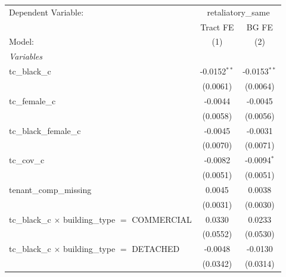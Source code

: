 \par\endgroup
\begingroup
\centering
\begin{tabular}{lcc}
   \tabularnewline \midrule \midrule
   Dependent Variable: & \multicolumn{2}{c}{retaliatory\_same}\\
                                                                       & Tract FE       & BG FE \\   
   Model:                                                              & (1)            & (2)\\  
   \midrule
   \emph{Variables}\\
   tc\_black\_c                                                        & -0.0152$^{**}$ & -0.0153$^{**}$\\   
                                                                       & (0.0061)       & (0.0064)\\   
   tc\_female\_c                                                       & -0.0044        & -0.0045\\   
                                                                       & (0.0058)       & (0.0056)\\   
   tc\_black\_female\_c                                                & -0.0045        & -0.0031\\   
                                                                       & (0.0070)       & (0.0071)\\   
   tc\_cov\_c                                                          & -0.0082        & -0.0094$^{*}$\\   
                                                                       & (0.0051)       & (0.0051)\\   
   tenant\_comp\_missing                                               & 0.0045         & 0.0038\\   
                                                                       & (0.0031)       & (0.0030)\\   
   tc\_black\_c $\times$ building\_type $=$ COMMERCIAL                 & 0.0330         & 0.0233\\   
                                                                       & (0.0552)       & (0.0530)\\   
   tc\_black\_c $\times$ building\_type $=$ DETACHED                   & -0.0048        & -0.0130\\   
                                                                       & (0.0342)       & (0.0314)\\   

\end{tabular}
